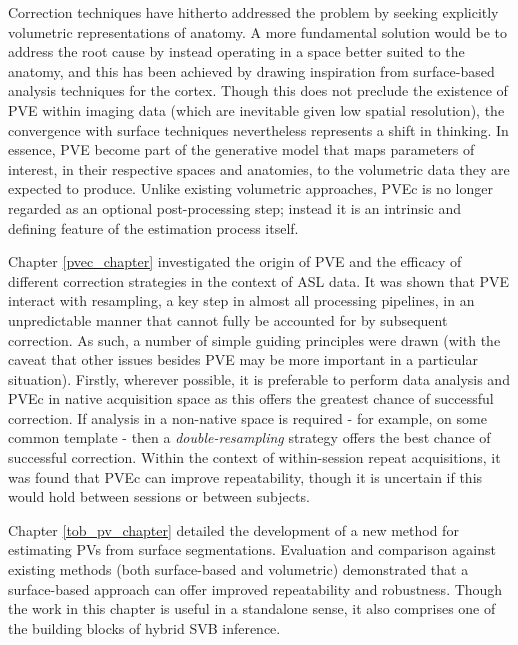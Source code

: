 \documentclass[12pt]{report}
\begin{document}
Correction techniques have hitherto addressed the problem by seeking explicitly volumetric representations of anatomy. A more fundamental solution would be to address the root cause by instead operating in a space better suited to the anatomy, and this has been achieved by drawing inspiration from surface-based analysis techniques for the cortex. Though this does not preclude the existence of PVE within imaging data (which are inevitable given low spatial resolution), the convergence with surface techniques nevertheless represents a shift in thinking. In essence, PVE become part of the generative model that maps parameters of interest, in their respective spaces and anatomies, to the volumetric data they are expected to produce. Unlike existing volumetric approaches, PVEc is no longer regarded as an optional post-processing step; instead it is an intrinsic and defining feature of the estimation process itself. 

Chapter \ref{pvec_chapter} investigated the origin of PVE and the efficacy of different correction strategies in the context of ASL data. It was shown that PVE interact with resampling, a key step in almost all processing pipelines, in an unpredictable manner that cannot fully be accounted for by subsequent correction. As such, a number of simple guiding principles were drawn (with the caveat that other issues besides PVE may be more important in a particular situation). Firstly, wherever possible, it is preferable to perform data analysis and PVEc in native acquisition space as this offers the greatest chance of successful correction. If analysis in a non-native space is required - for example, on some common template - then a \textit{double-resampling} strategy offers the best chance of successful correction. Within the context of within-session repeat acquisitions, it was found that PVEc can improve repeatability, though it is uncertain if this would hold between sessions or between subjects. 

Chapter \ref{tob_pv_chapter} detailed the development of a new method for estimating PVs from surface segmentations. Evaluation and comparison against existing methods (both surface-based and volumetric) demonstrated that a surface-based approach can offer improved repeatability and robustness. Though the work in this chapter is useful in a standalone sense, it also comprises one of the building blocks of hybrid SVB inference. 
\end{document}
